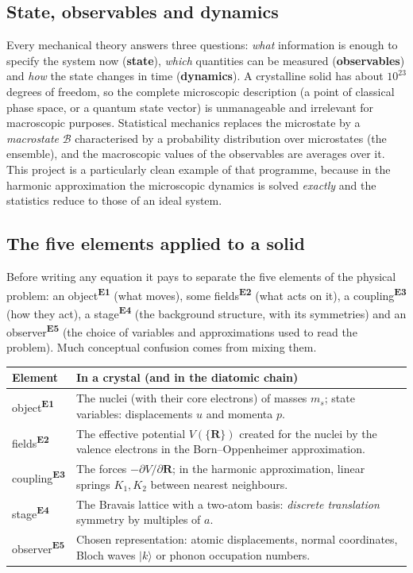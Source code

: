 \documentclass[11pt,a4paper]{article}
\newcommand{\Eobj}{object\textsuperscript{\textcolor{eobj}{\textbf{E1}}}}
\newcommand{\Ecams}{fields\textsuperscript{\textcolor{ecam}{\textbf{E2}}}}
\newcommand{\Eaco}{coupling\textsuperscript{\textcolor{eaco}{\textbf{E3}}}}
\newcommand{\Eesc}{stage\textsuperscript{\textcolor{eesc}{\textbf{E4}}}}
\newcommand{\Eobs}{observer\textsuperscript{\textcolor{eobs}{\textbf{E5}}}}
\begin{document}
\subsection{State, observables and dynamics}

Every mechanical theory answers three questions: \emph{what} information is
enough to specify the system now (\textbf{state}), \emph{which} quantities can
be measured (\textbf{observables}) and \emph{how} the state changes in time
(\textbf{dynamics}). A crystalline solid has about $10^{23}$ degrees of
freedom, so the complete microscopic description (a point of classical phase
space, or a quantum state vector) is unmanageable and irrelevant for
macroscopic purposes. Statistical mechanics replaces the microstate by a
\emph{macrostate} $\mathcal B$ characterised by a probability distribution over
microstates (the ensemble), and the macroscopic values of the observables are
averages over it. This project is a particularly clean example of that
programme, because in the harmonic approximation the microscopic dynamics is
solved \emph{exactly} and the statistics reduce to those of an ideal system.

\subsection{The five elements applied to a solid}

Before writing any equation it pays to separate the five elements of the
physical problem: an \Eobj{} (what moves), some \Ecams{} (what acts on it), a
\Eaco{} (how they act), a \Eesc{} (the background structure, with its
symmetries) and an \Eobs{} (the choice of variables and approximations used to
read the problem). Much conceptual confusion comes from mixing them.

\begin{center}
\small
\begin{tabularx}{\textwidth}{@{}l X@{}}
\toprule
Element & In a crystal (and in the diatomic chain)\\
\midrule
\Eobj & The nuclei (with their core electrons) of masses $m_s$; state variables: displacements $u$ and momenta $p$.\\
\Ecams & The effective potential $V(\{\bm R\})$ created for the nuclei by the valence electrons in the Born–Oppenheimer approximation.\\
\Eaco & The forces $-\partial V/\partial \bm R$; in the harmonic approximation, linear springs $K_1,K_2$ between nearest neighbours.\\
\Eesc & The Bravais lattice with a two-atom basis: \emph{discrete translation} symmetry by multiples of $a$.\\
\Eobs & Chosen representation: atomic displacements, normal coordinates, Bloch waves $|k\rangle$ or phonon occupation numbers.\\
\bottomrule
\end{tabularx}
\end{center}
\end{document}
